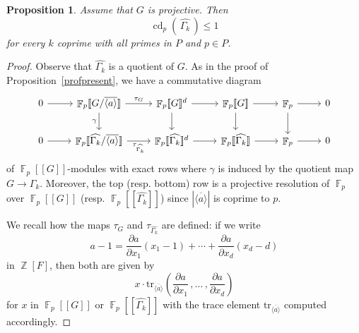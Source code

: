 \documentclass[a4paper]{amsart}
\newtheorem{pro}[lem]{Proposition}
\theoremstyle{definition}
\theoremstyle{remark}
\DeclareMathOperator{\bbz}{\mathbb{Z}}
\DeclareMathOperator{\bbf}{\mathbb{F}}
\DeclareMathOperator{\cd}{\mathrm{cd}}
\newcommand{\FFalgebra}[1]{\bbf_p[\![#1]\!]}
\begin{document}
\begin{pro}\label{powerquotient}
Assume that $G$ is projective. Then \[\cd_p\!\left(\,\widehat{\Gamma_k}\,\right) \leq 1\] for every \(k\) coprime with all primes in \(P\) and \(p \in P\).
\end{pro}
\begin{proof} Observe that \(\widehat{\Gamma_k}\) is a quotient of \(G\). As in the proof of Proposition~\ref{profpresent}, we have a commutative diagram
\[\begin{tikzcd}
0 \arrow[r] & \FFalgebra{G/\overline{\langle a \rangle}} \arrow[r, "\tau_G"] \arrow[d, "\gamma"']                 & \FFalgebra{G}^d \arrow[r] \arrow[d]        & \FFalgebra{G} \arrow[r] \arrow[d]        & \bbf_p \arrow[r] \arrow[d] & 0 \\
0 \arrow[r] & \FFalgebra{\widehat{\Gamma_k}/\overline{\langle a \rangle}} \arrow[r, "\tau_{\widehat{\Gamma_k}}"'] & \FFalgebra{\widehat{\Gamma_k}}^d \arrow[r] & \FFalgebra{\widehat{\Gamma_k}} \arrow[r] & \bbf_p \arrow[r]           & 0
\end{tikzcd}\] of \(\FFalgebra{G}\)-modules with exact rows where \(\gamma\) is induced by the quotient map \(G \to \widehat{\Gamma_k}\). Moreover, the top (resp. bottom) row is a projective resolution of \(\bbf_p\) over \(\FFalgebra{G}\) (resp. \(\FFalgebra{\widehat{\Gamma_k}}\)) since \(|\overline{\langle a \rangle}|\) is coprime to \(p\).

We recall how the maps \(\tau_G\) and \(\tau_{\widehat{\Gamma_k}}\) are defined: if we write \[a-1 = \frac{\partial a}{\partial x_1}(x_1-1)+\cdots+\frac{\partial a}{\partial x_d}(x_d-d)\] in \(\bbz[F]\), then both are given by \[x \cdot \mathrm{tr}_{\overline{\langle a \rangle}} \left(\frac{\partial a}{\partial x_1}\,,\ldots\,, \frac{\partial a}{\partial x_d}\right)\] for \(x\) in \(\FFalgebra{G}\) or \(\FFalgebra{\widehat{\Gamma_k}}\) with the trace element \(\mathrm{tr}_{\overline{\langle a \rangle}}\) computed accordingly.


\end{proof}
\end{document}
